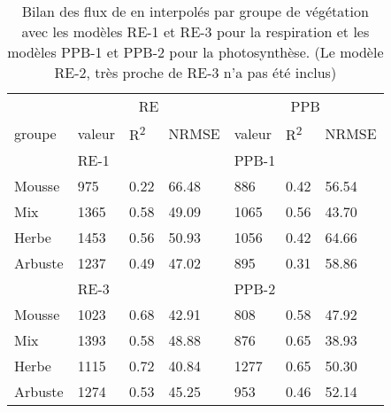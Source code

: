 
\begin{table}
\centering
\caption{Bilan des flux de \coo en \si{\gcma} interpolés par groupe de végétation avec les modèles RE-1 et RE-3 pour la respiration et les modèles PPB-1 et PPB-2 pour la photosynthèse. (Le modèle RE-2, très proche de RE-3 n'a pas été inclus)}
\label{table:flux_grp}
\begin{tabular}{lllllll}\toprule
& \multicolumn{3}{c}{RE} &  \multicolumn{3}{c}{PPB} \\ \cmidrule(lr){2-4} \cmidrule(lr){5-7} 
groupe & valeur & R\textsuperscript{2} & NRMSE & valeur & R\textsuperscript{2} & NRMSE\\ \midrule
& \multicolumn{3}{l}{RE-1} &  \multicolumn{3}{l}{PPB-1} \\
Mousse &  \num{975} & \num{0.22} & \num{66.48} & \num{886} & \num{0.42} & \num{56.54} \\
Mix &  \num{1365} & \num{0.58} & \num{49.09} & \num{1065} & \num{0.56} & \num{43.70}  \\
Herbe &  \num{1453} & \num{0.56} & \num{50.93}  & \num{1056} & \num{0.42} & \num{64.66} \\
Arbuste &  \num{1237} & \num{0.49} & \num{47.02} & \num{895} & \num{0.31} & \num{58.86}  \\ [+1ex]
& \multicolumn{3}{l}{RE-3} &  \multicolumn{3}{l}{PPB-2} \\
Mousse &  \num{1023} & \num{0.68} & \num{42.91} & \num{808} & \num{0.58} & \num{47.92} \\
Mix &  \num{1393} & \num{0.58} & \num{48.88} & \num{876} & \num{0.65} & \num{38.93}  \\
Herbe &  \num{1115} & \num{0.72} & \num{40.84}  & \num{1277} & \num{0.65} & \num{50.30} \\
Arbuste &  \num{1274} & \num{0.53} & \num{45.25} & \num{953} & \num{0.46} & \num{52.14}  \\
\bottomrule
\end{tabular}
\end{table}

